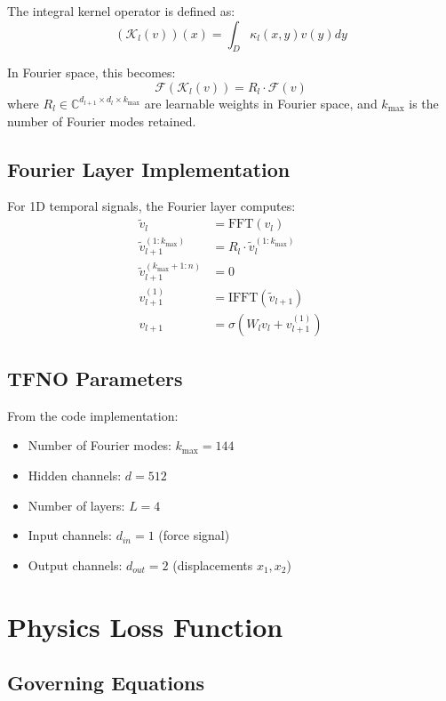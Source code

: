 \documentclass{article}
\begin{document}
The integral kernel operator is defined as:
\begin{equation}
(\mathcal{K}_l(v))(x) = \int_D \kappa_l(x, y) v(y) dy
\end{equation}

In Fourier space, this becomes:
\begin{equation}
\mathcal{F}(\mathcal{K}_l(v)) = R_l \cdot \mathcal{F}(v)
\end{equation}
where $R_l \in \mathbb{C}^{d_{l+1} \times d_l \times k_{\max}}$ are learnable weights in Fourier space, and $k_{\max}$ is the number of Fourier modes retained.

\subsection{Fourier Layer Implementation}

For 1D temporal signals, the Fourier layer computes:
\begin{align}
\tilde{v}_l &= \text{FFT}(v_l) \\
\tilde{v}_{l+1}^{(1:k_{\max})} &= R_l \cdot \tilde{v}_l^{(1:k_{\max})} \\
\tilde{v}_{l+1}^{(k_{\max}+1:n)} &= 0 \\
v_{l+1}^{(1)} &= \text{IFFT}(\tilde{v}_{l+1}) \\
v_{l+1} &= \sigma(W_l v_l + v_{l+1}^{(1)})
\end{align}

\subsection{TFNO Parameters}

From the code implementation:
\begin{itemize}
\item Number of Fourier modes: $k_{\max} = 144$
\item Hidden channels: $d = 512$
\item Number of layers: $L = 4$
\item Input channels: $d_{in} = 1$ (force signal)
\item Output channels: $d_{out} = 2$ (displacements $x_1, x_2$)
\end{itemize}

\section{Physics Loss Function}

\subsection{Governing Equations}
\end{document}
